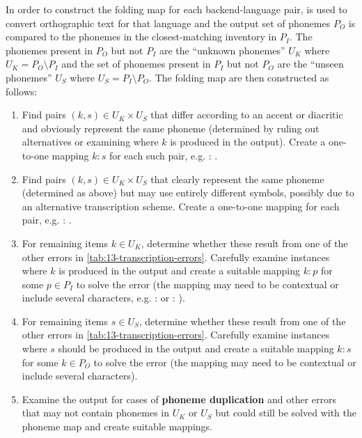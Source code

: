 In order to construct the folding map for each backend-language pair, \gpp is used to convert orthographic text for that language and the output set of phonemes $P_O$ is compared to the phonemes in the closest-matching inventory in \phoible $P_I$. The phonemes present in $P_O$ but not $P_I$ are the ``unknown phonemes'' $U_K$ where $U_K = P_O \setminus P_I $ and the set of phonemes present in $P_I$ but not $P_O$ are the ``unseen phonemes'' $U_S$ where $U_S = P_I \setminus P_O $. The folding map are then constructed as follows:
\begin{enumerate}
    \item Find pairs $(k,s) \in U_K \times U_S$ that differ according to an accent or diacritic and obviously represent the same phoneme (determined by ruling out alternatives or examining where $k$ is produced in the output). Create a one-to-one mapping $k:s$ for each such pair, e.g.  : .
    \item Find pairs $(k,s) \in U_K \times U_S$ that clearly represent the same phoneme (determined as above) but may use entirely different symbols, possibly due to an alternative transcription scheme. Create a one-to-one mapping for each pair, e.g.  : \textipa{\ae}.
    \item For remaining items $k \in U_K$, determine whether these result from one of the other errors in \cref{tab:13-transcription-errors}. Carefully examine instances where $k$ is produced in the output and create a suitable mapping $k : p$ for some $p \in P_I$ to solve the error (the mapping may need to be contextual or include several characters, e.g. \textipa{\textrhookschwa} :  or  : ). 
    \item For remaining items $s \in U_S$, determine whether these result from one of the other errors in \cref{tab:13-transcription-errors}. Carefully examine instances where $s$ should be produced in the output and create a suitable mapping $k : s$ for some $k \in P_O$ to solve the error (the mapping may need to be contextual or include several characters). 
    \item Examine the output for cases of \textbf{phoneme duplication} and other errors that may not contain phonemes in $U_K$ or $U_S$ but could still be solved with the phoneme map and create suitable mappings.
\end{enumerate}

